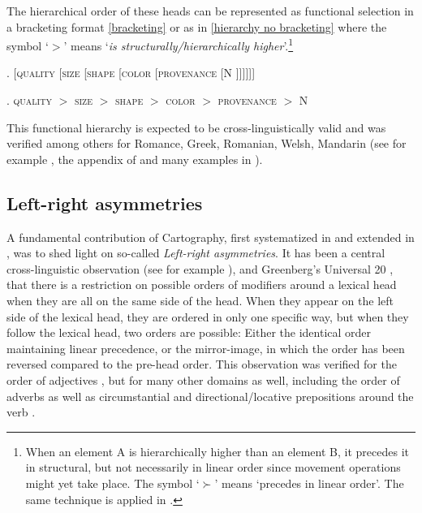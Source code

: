 The hierarchical order of these heads can be represented as functional selection in a bracketing format \ref{bracketing} or as in \ref{hierarchy no bracketing} where the symbol `$>$' means `\textit{is structurally/hierarchically higher}’.\footnote{When an element A is hierarchically higher than an element B, it precedes it in structural, but not necessarily in linear order since movement operations might yet take place. The symbol `$\succ$’ means `precedes in linear order’. The same technique is applied in \citet{panayidou:2013:in}.}

\ex. [\textsc{quality} [\textsc{size} [\textsc{shape} [\textsc{color} [\textsc{provenance} [N ]]]]]] \label{bracketing}

\ex. \textsc{quality} $>$ \textsc{size} $>$ \textsc{shape} $>$ \textsc{color} $>$ \textsc{provenance} $>$ N \label{hierarchy no bracketing}

This functional hierarchy is expected to be cross-linguistically valid and was verified among others for Romance,  Greek,  Romanian,  Welsh,  Mandarin (see for example \citealt{scott:2002:stacked}, the appendix of \citealt{cinque:2010:adj} and many examples in \citealt{alex:2007:nounphrase}).

\subsection{Left-right asymmetries} \label{left-right}

A fundamental contribution of Cartography, first systematized in \citet{cinque:2005:deriving, cinque:2009:fundamental} and extended in \citet{cinque:2023:linearization, cinque:2025:superiority}, was to shed light on so-called \textit{Left-right asymmetries}. It has been a central cross-linguistic observation (see for example \citealt{rijkhoff:2002:noun}), and Greenberg's Universal 20 \citep{greenberg:1963:some}, that there is a restriction on possible orders of modifiers around a lexical head when they are all on the same side of the head. When they appear on the left side of the lexical head, they are ordered in only one specific way, but when they follow the lexical head, two orders are possible: Either the identical order maintaining linear precedence, or the mirror-image, in which the order has been reversed compared to the pre-head order. This observation was verified for the order of adjectives \citep{cinque:2009:fundamental, shlonsky:2004:form}, but for many other domains as well, including the order of adverbs as well as circumstantial and directional/locative prepositions around the verb \citep[167–168]{cinque:2009:fundamental}.  

